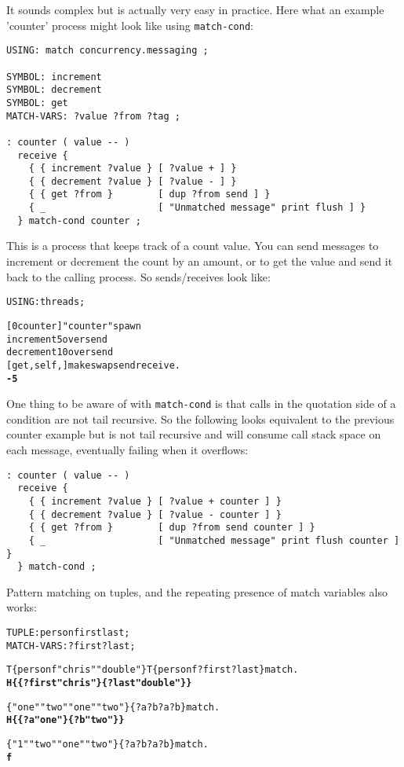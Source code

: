 
It sounds complex but is actually very easy in practice. Here what an
example 'counter' process might look like using \verb|match-cond|:

\begin{verbatim}
USING: match concurrency.messaging ;

SYMBOL: increment
SYMBOL: decrement
SYMBOL: get
MATCH-VARS: ?value ?from ?tag ;

: counter ( value -- )
  receive {
    { { increment ?value } [ ?value + ] }
    { { decrement ?value } [ ?value - ] }
    { { get ?from }        [ dup ?from send ] }
    { _                    [ "Unmatched message" print flush ] }
  } match-cond counter ;
\end{verbatim}

This is a process that keeps track of a count value. You can send
messages to increment or decrement the count by an amount, or to get
the value and send it back to the calling process. So sends/receives
look like:

\begin{alltt}
USING: threads ;

[ 0 counter ] "counter" spawn
{ increment 5 } over send
{ decrement 10 } over send
[ get , self , ] { } make swap send receive .
  \textbf{-5}
\end{alltt}

One thing to be aware of with \verb|match-cond| is that calls in the
quotation side of a condition are not tail recursive. So the following
looks equivalent to the previous counter example but is not tail
recursive and will consume call stack space on each message,
eventually failing when it overflows:

\begin{verbatim}
: counter ( value -- )
  receive {
    { { increment ?value } [ ?value + counter ] }
    { { decrement ?value } [ ?value - counter ] }
    { { get ?from }        [ dup ?from send counter ] }
    { _                    [ "Unmatched message" print flush counter ] }
  } match-cond ;
\end{verbatim}

Pattern matching on tuples, and the repeating presence of match
variables also works:

\begin{alltt}
TUPLE: person first last ;
MATCH-VARS: ?first ?last ;

T\{ person f "chris" "double" \} T\{ person f ?first ?last \} match .
  \textbf{H\{ \{ ?first "chris" \} \{ ?last "double" \} \}}

\{ "one" "two" "one" "two" \} \{ ?a ?b ?a ?b \} match .
  \textbf{H\{ \{ ?a "one" \} \{ ?b "two" \} \}}

\{ "1" "two" "one" "two" \} \{ ?a ?b ?a ?b \} match .
  \textbf{f}
\end{alltt}
